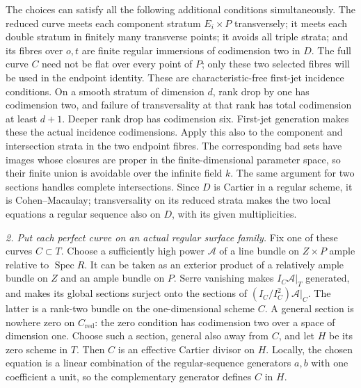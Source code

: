 The choices can satisfy all the following additional conditions
simultaneously.  The reduced curve meets each component stratum
$E_i\times P$ transversely; it meets each double stratum in finitely
many transverse points; it avoids all triple strata; and its fibres
over $o,t$ are finite regular immersions of codimension two in $D$.
The full curve $C$ need not be flat over every point of $P$;
only these two selected fibres will be used in the endpoint identity.
These are characteristic-free first-jet incidence conditions.
On a smooth stratum of dimension $d$, rank drop by one has
codimension two, and failure of transversality at that rank has
total codimension at least $d+1$.  Deeper rank drop has codimension
six.  First-jet generation makes these the actual incidence
codimensions.  Apply this also to the component and intersection
strata in the two endpoint fibres.  The corresponding bad sets
have images whose closures are proper in the finite-dimensional
parameter space, so their finite union is avoidable over the infinite field
$k$.  The same argument for two sections handles complete
intersections.  Since $D$ is Cartier in a regular scheme, it is
Cohen--Macaulay; transversality on its reduced strata makes the
two local equations a regular sequence also on $D$, with its
given multiplicities.

\emph{2. Put each perfect curve on an actual regular surface family.}
Fix one of these curves $C\subset T$.  Choose a sufficiently high
power $\mathcal A$ of a line bundle on $Z\times P$ ample relative
to $\operatorname{Spec}R$.  It can be taken as an exterior product
of a relatively ample bundle on $Z$ and an ample bundle on $P$.
Serre vanishing makes $I_C\mathcal A|_T$ generated, and makes its
global sections surject onto the sections of
$(I_C/I_C^2)\mathcal A|_C$.  The latter is a rank-two bundle on
the one-dimensional scheme $C$.  A general section is nowhere
zero on $C_{\mathrm{red}}$: the zero condition has codimension two
over a space of dimension one.  Choose such a section, general
also away from $C$, and let $H$ be its zero scheme in $T$.
Then $C$ is an effective Cartier divisor on $H$.  Locally, the
chosen equation is a linear combination of the regular-sequence
generators $a,b$ with one coefficient a unit, so the complementary
generator defines $C$ in $H$.

